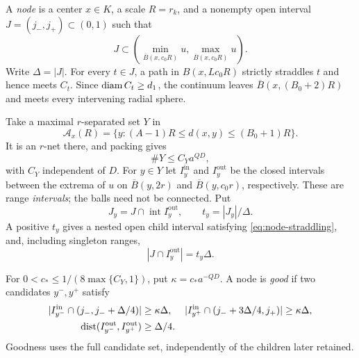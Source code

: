 A \emph{node} is a center $x\in K$, a scale $R=r_k$, and a nonempty
open interval $J=(j_-,j_+)\subset(0,1)$ such that
\begin{equation}
 J\subset\left(\min_{\overline B(x,c_0R)}u,
                   \max_{\overline B(x,c_0R)}u\right).
 \label{eq:node-straddling}
\end{equation}
Write $\Delta=|J|$. For every $t\in J$, a path in $B(x,Lc_0R)$
strictly straddles $t$ and hence meets $C_t$. Since
$\operatorname{diam} C_t\geq d_1$, the continuum leaves
$\overline B(x,(B_0+2)R)$ and meets every intervening radial sphere.

Take a maximal $r$-separated set $Y$ in
\[
 \mathcal A_x(R)=\{y:(A-1)R\leq d(x,y)\leq(B_0+1)R\}.
\]
It is an $r$-net there, and packing gives
\begin{equation}
 \#Y\leq C_Ya^{QD},
 \label{eq:candidate-count}
\end{equation}
with $C_Y$ independent of $D$. For $y\in Y$ let $I_y^{\mathrm{in}}$
and $I_y^{\mathrm{out}}$ be the closed intervals between the extrema
of $u$ on $\overline B(y,2r)$ and $\overline B(y,c_0r)$, respectively.
These are range \emph{intervals}; the balls need not be connected. Put
\[
 J_y=J\cap\operatorname{int}I_y^{\mathrm{out}},\qquad
 t_y=|J_y|/\Delta.
\]
A positive $t_y$ gives a nested open child interval satisfying
\eqref{eq:node-straddling}, and, including singleton ranges,
\begin{equation}
 |J\cap I_y^{\mathrm{out}}|=t_y\Delta.
 \label{eq:closed-range-length}
\end{equation}

For $0<c_*\leq1/(8\max\{C_Y,1\})$, put $\kappa=c_*a^{-QD}$.
A node is \emph{good} if two candidates $y^-,y^+$ satisfy
\begin{align}
 |I_{y^-}^{\mathrm{in}}\cap(j_-,j_-+\Delta/4)|&\geq\kappa\Delta,
 &|I_{y^+}^{\mathrm{in}}\cap(j_-+3\Delta/4,j_+)|&\geq\kappa\Delta,
 \label{eq:good-inner}\\
 \operatorname{dist}(I_{y^-}^{\mathrm{out}},I_{y^+}^{\mathrm{out}})&\geq\Delta/4.
 \label{eq:good-outer}
\end{align}
Goodness uses the full candidate set, independently of the children
later retained.


